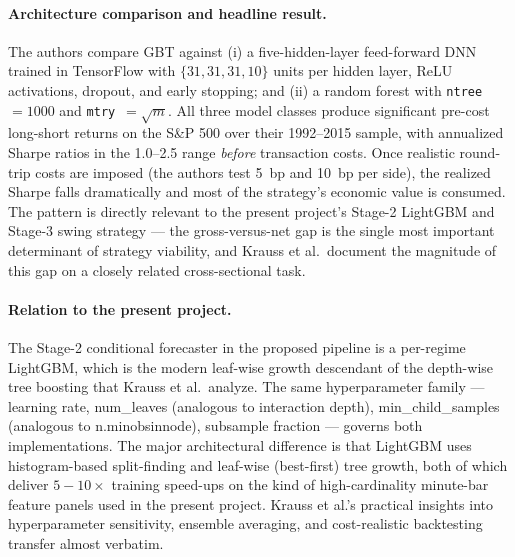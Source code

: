 \documentclass[11pt]{article}
\begin{document}
\paragraph{Architecture comparison and headline result.}  The authors compare GBT against (i) a five-hidden-layer feed-forward DNN trained in TensorFlow with $\{31, 31, 31, 10\}$ units per hidden layer, ReLU activations, dropout, and early stopping; and (ii) a random forest with \texttt{ntree}~$= 1000$ and \texttt{mtry}~$= \sqrt{m}$.  All three model classes produce significant pre-cost long-short returns on the S\&P 500 over their 1992--2015 sample, with annualized Sharpe ratios in the 1.0--2.5 range \emph{before} transaction costs.  Once realistic round-trip costs are imposed (the authors test 5~bp and 10~bp per side), the realized Sharpe falls dramatically and most of the strategy's economic value is consumed.  The pattern is directly relevant to the present project's Stage-2 LightGBM and Stage-3 swing strategy --- the gross-versus-net gap is the single most important determinant of strategy viability, and Krauss et al.\ document the magnitude of this gap on a closely related cross-sectional task.

\paragraph{Relation to the present project.}  The Stage-2 conditional forecaster in the proposed pipeline is a per-regime LightGBM, which is the modern leaf-wise growth descendant of the depth-wise tree boosting that Krauss et al.\ analyze.  The same hyperparameter family --- learning rate, num\_leaves (analogous to interaction depth), min\_child\_samples (analogous to n.minobsinnode), subsample fraction --- governs both implementations.  The major architectural difference is that LightGBM uses histogram-based split-finding and leaf-wise (best-first) tree growth, both of which deliver $5\!-\!10\!\times$ training speed-ups on the kind of high-cardinality minute-bar feature panels used in the present project.  Krauss et al.'s practical insights into hyperparameter sensitivity, ensemble averaging, and cost-realistic backtesting transfer almost verbatim.
\end{document}
